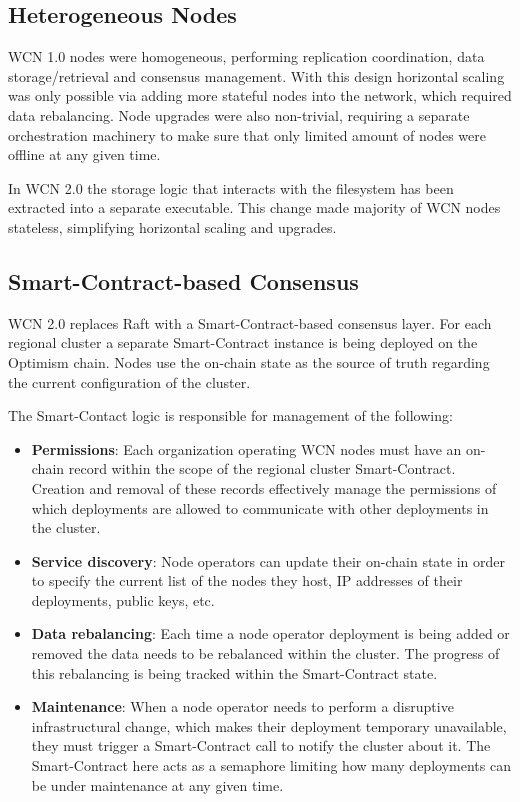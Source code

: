 \documentclass[10pt,twocolumn]{article}
\begin{document}
\subsection{Heterogeneous Nodes}

WCN 1.0 nodes were homogeneous, performing replication coordination, data storage/retrieval and consensus management.
With this design horizontal scaling was only possible via adding more stateful nodes into the network, which required data rebalancing.
Node upgrades were also non-trivial, requiring a separate orchestration machinery to make sure that only limited amount of nodes were offline at any given time.

In WCN 2.0 the storage logic that interacts with the filesystem has been extracted into a separate executable.
This change made majority of WCN nodes stateless, simplifying horizontal scaling and upgrades.

\subsection{Smart-Contract-based Consensus}

WCN 2.0 replaces Raft with a Smart-Contract-based consensus layer.
For each regional cluster a separate Smart-Contract instance is being deployed on the Optimism chain.
Nodes use the on-chain state as the source of truth regarding the current configuration of the cluster.

The Smart-Contact logic is responsible for management of the following:
\begin{itemize}
    \item \textbf{Permissions}: Each organization operating WCN nodes must have an on-chain record within the scope of the regional cluster Smart-Contract.
    Creation and removal of these records effectively manage the permissions of which deployments are allowed to communicate with other deployments in the cluster.
    \item \textbf{Service discovery}: Node operators can update their on-chain state in order to specify the current list of the nodes they host, IP addresses of their deployments, public keys, etc.
    \item \textbf{Data rebalancing}: Each time a node operator deployment is being added or removed the data needs to be rebalanced within the cluster.
    The progress of this rebalancing is being tracked within the Smart-Contract state.
    \item \textbf{Maintenance}: When a node operator needs to perform a disruptive infrastructural change, which makes their deployment temporary unavailable,
    they must trigger a Smart-Contract call to notify the cluster about it. The Smart-Contract here acts as a semaphore limiting how many deployments can be under maintenance at any given time.
\end{itemize}
\end{document}
